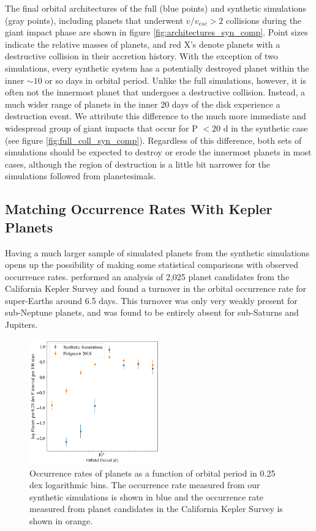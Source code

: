 The final orbital architectures of the full (blue points) and synthetic simulations (gray points), including planets that underwent $v/v_{esc} > 2$ collisions during the giant impact phase are shown in figure \ref{fig:architectures_syn_comp}. Point sizes indicate the relative masses of planets, and red X's denote planets with a destructive collision in their accretion history. With the exception of two simulations, every synthetic system has a potentially destroyed planet within the inner $\sim 10$ or so days in orbital period. Unlike the full simulations, however, it is often not the innermost planet that undergoes a destructive collision. Instead, a much wider range of planets in the inner 20 days of the disk experience a destruction event. We attribute this difference to the much more immediate and widespread group of giant impacts that occur for P $< 20$ d in the synthetic case (see figure \ref{fig:full_coll_syn_comp}). Regardless of this difference, both sets of simulations should be expected to destroy or erode the innermost planets in most cases, although the region of destruction is a little bit narrower for the simulations followed from planetesimals.

\subsection{Matching Occurrence Rates With Kepler Planets}

Having a much larger sample of simulated planets from the synthetic simulations opens up the possibility of making some statistical comparisons with observed occurrence rates. \cite{petigura18} performed an analysis of 2,025 planet candidates from the California Kepler Survey and found a turnover in the orbital occurrence rate for super-Earths around 6.5 days. This turnover was only very weakly present for sub-Neptune planets, and was found to be entirely absent for sub-Saturns and Jupiters.

\begin{figure}
\begin{center}
    \includegraphics[width=0.5\textwidth]{figures/stip/occurrence_syn.png}
    \caption{Occurrence rates of planets as a function of orbital period in 0.25 dex logarithmic bins. The occurrence rate measured from our synthetic simulations is shown in blue and the occurrence rate measured from planet candidates in the California Kepler Survey \cite{petigura18} is shown in orange.\label{fig:occurrence_syn}}
\end{center}
\end{figure}

